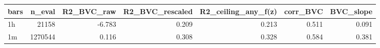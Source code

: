 \begin{tabular}{lrrrrrr}
\toprule
bars & n_eval & R2_BVC_raw & R2_BVC_rescaled & R2_ceiling_any_f(z) & corr_BVC & BVC_slope \\
\midrule
1h & 21158 & -6.783 & 0.209 & 0.213 & 0.511 & 0.091 \\
1m & 1270544 & 0.116 & 0.308 & 0.328 & 0.584 & 0.381 \\
\bottomrule
\end{tabular}
